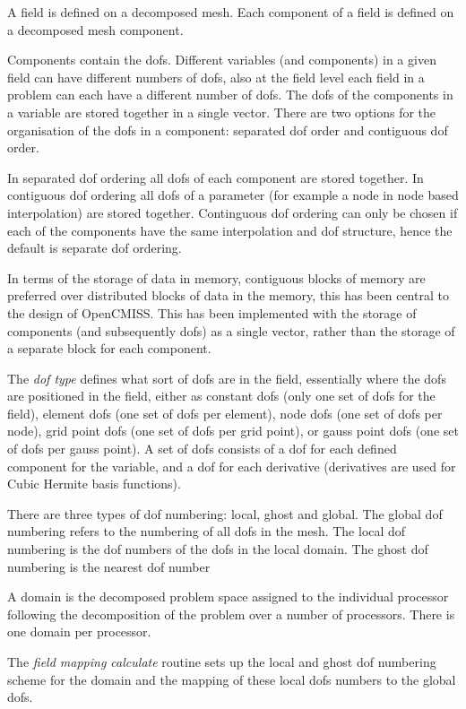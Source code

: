 A field is defined on a decomposed mesh. Each component of a field is defined 
on a decomposed mesh component.

Components contain the dofs. Different variables (and components) in a given 
field can have different numbers of dofs, also at the field level each field 
in a problem can each have a different number of dofs. The dofs of the 
components in a variable are stored together in a single vector. There are 
two options for the organisation of the dofs in a component: separated dof 
order and contiguous dof order. 

In separated dof ordering all dofs of each component are stored together.
In contiguous dof ordering all dofs of a parameter (for example a node in 
node based interpolation) are stored together. Continguous dof ordering can 
only be chosen if each of the components have the same interpolation and dof 
structure, hence the default is separate dof ordering.

In terms of the storage of data in memory, contiguous blocks of memory are 
preferred over distributed blocks of data in the memory, this has been central 
to the design of OpenCMISS. This has been implemented with the storage of 
components (and subsequently dofs) as a single vector, rather than the storage 
of a separate block for each component.

The \emph{dof type} defines what sort of dofs are in the field, essentially
where the dofs are positioned in the field, either as constant dofs (only one 
set of dofs for the field), element dofs (one set of dofs per element), node 
dofs (one set of dofs per node), grid point dofs (one set of dofs per grid point), 
or gauss point dofs (one set of dofs per gauss point). A set of dofs consists of 
a dof for each defined component for the variable, and a dof for each derivative 
(derivatives are used for Cubic Hermite basis functions).

There are three types of dof numbering: local, ghost and global. The global dof 
numbering refers to the numbering of all dofs in the mesh. The local dof
numbering is the dof numbers of the dofs in the local domain. The ghost dof 
numbering is the nearest dof number 

A domain is the decomposed problem space assigned to the individual processor 
following the decomposition of the problem over a number of processors. There
is one domain per processor. 

The \emph{field mapping calculate} routine sets up the local and ghost dof
numbering scheme for the domain and the mapping of these local dofs numbers 
to the global dofs.


